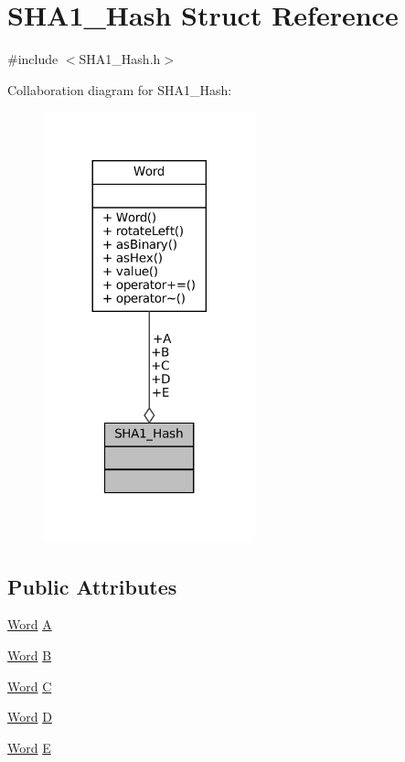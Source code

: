 \hypertarget{struct_s_h_a1___hash}{}\section{S\+H\+A1\+\_\+\+Hash Struct Reference}
\label{struct_s_h_a1___hash}


{\ttfamily \#include $<$S\+H\+A1\+\_\+\+Hash.\+h$>$}



Collaboration diagram for S\+H\+A1\+\_\+\+Hash\+:
\nopagebreak
\begin{figure}[H]
\begin{center}
\leavevmode
\includegraphics[width=173pt]{struct_s_h_a1___hash__coll__graph}
\end{center}
\end{figure}
\subsection*{Public Attributes}
\begin{DoxyCompactItemize}
\item 
\mbox{\hyperlink{class_word}{Word}} \mbox{\hyperlink{struct_s_h_a1___hash_a4847e731a0d3f92ef8f5bc8b5591ea88}{A}}
\item 
\mbox{\hyperlink{class_word}{Word}} \mbox{\hyperlink{struct_s_h_a1___hash_a0bf079d14bc6731bbb1bce277b6f88a1}{B}}
\item 
\mbox{\hyperlink{class_word}{Word}} \mbox{\hyperlink{struct_s_h_a1___hash_afc07bf99525ecc3305aac51813194f90}{C}}
\item 
\mbox{\hyperlink{class_word}{Word}} \mbox{\hyperlink{struct_s_h_a1___hash_a3bccc3529b9333d28a50dcea30a14701}{D}}
\item 
\mbox{\hyperlink{class_word}{Word}} \mbox{\hyperlink{struct_s_h_a1___hash_a14cd36776b156fc084f1e36757f3ab48}{E}}
\end{DoxyCompactItemize}


